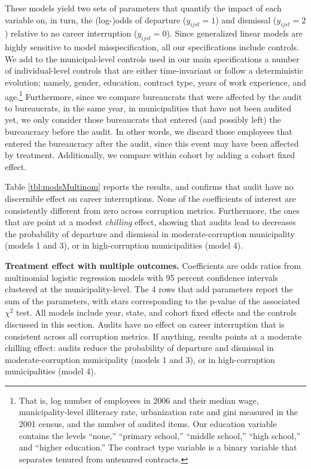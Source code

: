 {These models yield two sets of parameters that quantify the impact of each variable on, in turn, the (log-)odds of departure ($y_{ijst} = 1$) and dismissal ($y_{ijst} = 2$) relative to no career interruption ($y_{ijst} = 0$). Since generalized linear models are highly sensitive to model misspecification, all our specifications include controls. We add to the municipal-level controls used in our main specifications a number of individual-level controls that are either time-invariant or follow a deterministic evolution; namely, gender, education, contract type, years of work experience, and age.\footnote{That is, log number of employees in 2006 and their median wage, municipality-level illiteracy rate, urbanization rate and gini measured in the 2001 census, and the number of audited items. Our education variable contains the levels ``none,'' ``primary school,'' ``middle school,'' ``high school,'' and ``higher education.'' The contract type variable is a binary variable that separates tenured from untenured contracts.} Furthermore, since we compare bureaucrats that were affected by the audit to bureaucrats, in the same year, in municipalities that have not been audited yet, we only consider those bureaucrats that entered (and possibly left) the bureaucracy before the audit. In other words, we discard those employees that entered the bureaucracy after the audit, since this event may have been affected by treatment. Additionally, we compare within cohort by adding a cohort fixed effect. 

Table \ref{tbl:modsMultinom} reports the results, and confirms that audit have no discernible effect on career interruptions. None of the coefficients of interest are consistently different from zero across corruption metrics. Furthermore, the ones that are point at a modest \emph{chilling} effect, showing that audits lead to decreases the probability of departure and dismissal in moderate-corruption municipality (models 1 and 3), or in high-corruption municipalities (model 4). 


\begin{table}[H]
    \centering
    \footnotesize
	
	\caption{{\bf Treatment effect with multiple outcomes.} Coefficients are odds ratios from multinomial logistic regression models with 95 percent confidence intervals clustered at the municipality-level. The 4 rows that add parameters report the sum of the parameters, with stars corresponding to the p-value of the associated $\chi^2$ test. All models include year, state, and cohort fixed effects and the controls discussed in this section. Audits have no effect on career interruption that is consistent across all corruption metrics. If anything, results points at a moderate chilling effect: audits reduce the probability of departure and dismissal in moderate-corruption municipality (models 1 and 3), or in high-corruption municipalities (model 4).}
	\label{tbl:modsMultinom}
\end{table}


}
